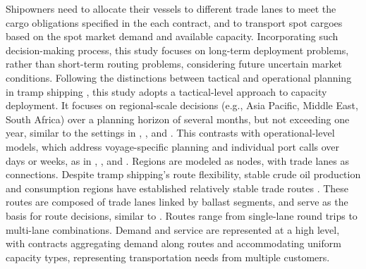 \documentclass[11pt,english]{article}
\begin{document}
Shipowners need to allocate their vessels to different trade lanes to meet the cargo obligations specified in the each contract, and to transport spot cargoes based on the spot market demand and available capacity. Incorporating such decision-making process, this study focuses on long-term deployment problems, rather than short-term routing problems, considering future uncertain market conditions. Following the distinctions between tactical and operational planning in tramp shipping \citep{pache2020tactical}, this study adopts a tactical-level approach to capacity deployment. It focuses on regional-scale decisions (e.g., Asia Pacific, Middle East, South Africa) over a planning horizon of several months, but not exceeding one year, similar to the settings in \citet{wang2018planning}, \citet{alvarez2011robust}, and \citet{pantuso2016uncertainty}. This contrasts with operational-level models, which address voyage-specific planning and individual port calls over days or weeks, as in \citet{meng2015tailored}, \citet{korsvik2011large}, and \citet{cheng2025cargo}. Regions are modeled as nodes, with trade lanes as connections. Despite tramp shipping's route flexibility, stable crude oil production and consumption regions have established relatively stable trade routes \citep{prochazka2019contracting}. These routes are composed of trade lanes linked by ballast segments, and serve as the basis for route decisions, similar to \cite{pantuso2016uncertainty}. Routes range from single-lane round trips to multi-lane combinations. Demand and service are represented at a high level, with contracts aggregating demand along routes and accommodating uniform capacity types, representing transportation needs from multiple customers.
\end{document}
